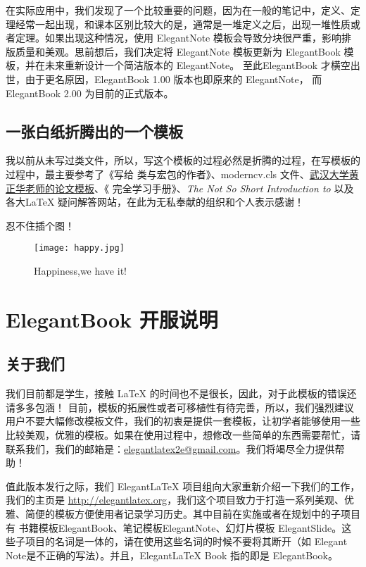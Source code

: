 \documentclass[mathpazo,titlestyle=hang,11pt]{elegantbook}
\begin{document}
在实际应用中，我们发现了一个比较重要的问题，因为在一般的笔记中，定义、定理经常一起出现，和课本区别比较大的是，通常是一堆定义之后，出现一堆性质或者定理。如果出现这种情况，使用 ElegantNote 模板会导致分块很严重，影响排版质量和美观。思前想后，我们决定将 ElegantNote 模板更新为 ElegantBook 模板，并在未来重新设计一个简洁版本的 ElegantNote。 至此ElegantBook 才横空出世，由于更名原因，ElegantBook 1.00 版本也即原来的 ElegantNote， 而ElegantBook 2.00 为目前的正式版本。

\section{一张白纸折腾出的一个模板}

我以前从未写过类文件，所以，写这个模板的过程必然是折腾的过程，在写模板的过程中，最主要参考了《写给\LaTeXe{} 类与宏包的作者》\cite{packagewriter}、moderncv.cls 文件、\href{http://aff.whu.edu.cn/huangzh/}{武汉大学黄正华老师的论文模板}、《\LaTeXe{} 完全学习手册》\cite{complete}、{\itshape The Not So Short Introduction to \LaTeXe{}}\cite{oetiker2010not}以及各大\LaTeX{} 疑问解答网站，在此为无私奉献的组织和个人表示感谢！

{\color{third}忍不住插个图！}

\begin{figure}[!hbtp]
\texttt{[image: happy.jpg]}
\caption{Happiness,we have it!\label{figur:happy}}
\end{figure}

\chapter{ElegantBook 开服说明}
\section{关于我们}
 我们目前都是学生，接触 \LaTeX{} 的时间也不是很长，因此，对于此模板的错误还请多多包涵！ 目前，模板的拓展性或者可移植性有待完善，所以，我们强烈建议用户不要大幅修改模板文件，我们的初衷是提供一套模板，让初学者能够使用一些比较美观，优雅的模板。如果在使用过程中，想修改一些简单的东西需要帮忙，请联系我们，我们的邮箱是：\href{elegantlatex2e@gmail.com}{elegantlatex2e@gmail.com}。我们将竭尽全力提供帮助！

值此版本发行之际，我们 Elegant\LaTeX{} 项目组向大家重新介绍一下我们的工作，我们的主页是 \href{http://elegantlatex.org}{http://elegantlatex.org}，我们这个项目致力于打造一系列美观、优雅、简便的模板方便使用者记录学习历史。其中目前在实施或者在规划中的子项目有 书籍模板ElegantBook、笔记模板ElegantNote、幻灯片模板 ElegantSlide。这些子项目的名词是一体的，请在使用这些名词的时候不要将其断开（如 Elegant Note是不正确的写法）。并且，Elegant\LaTeX{}  Book 指的即是 ElegantBook。
\end{document}
